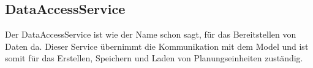 \subsection{DataAccessService}
Der DataAccessService ist wie der Name schon sagt, für das Bereitstellen von Daten da.
Dieser Service übernimmt die Kommunikation mit dem Model und ist somit für das Erstellen, Speichern und Laden
von Planungseinheiten zuständig.
